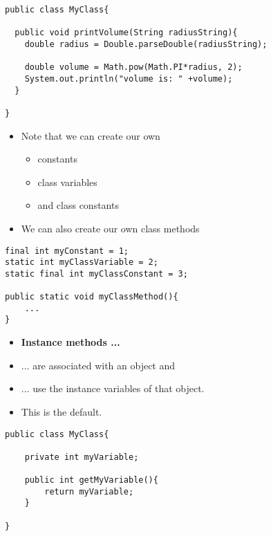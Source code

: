 \documentclass{beamer}
\begin{document}
\begin{frame}[fragile]
\begin{block}{}
\begin{lstlisting}
public class MyClass{

  public void printVolume(String radiusString){
    double radius = Double.parseDouble(radiusString);
    
    double volume = Math.pow(Math.PI*radius, 2);
    System.out.println("volume is: " +volume);
  } 
  
}
\end{lstlisting}
\end{block}
\end{frame}

\begin{frame}[fragile]
\begin{itemize}
\item Note that we can create our own
\begin{itemize}
\item constants
\item class variables
\item and class constants
\end{itemize} 
\item We can also create our own class methods
\end{itemize} 
\begin{block}{}
\begin{lstlisting}
final int myConstant = 1;
static int myClassVariable = 2;
static final int myClassConstant = 3;

public static void myClassMethod(){
    ...
} 
\end{lstlisting}
\end{block}
\end{frame} 

\begin{frame}[fragile]
\begin{itemize}
\item \textbf{Instance methods ... }
\item ... are associated with an object and 
\item ... use the instance variables of that object. 
\item This is the default. 
\end{itemize} 
\begin{block}{}
\begin{lstlisting}
public class MyClass{
    
    private int myVariable;
    
    public int getMyVariable(){
        return myVariable;
    }

}
\end{lstlisting}
\end{block}
\end{frame} 
\end{document}
